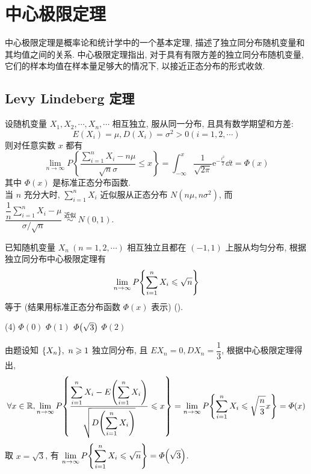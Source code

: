\section{中心极限定理}

中心极限定理是概率论和统计学中的一个基本定理, 描述了独立同分布随机变量和其均值之间的关系. 中心极限定理指出, 对于具有有限方差的独立同分布随机变量, 它们的样本均值在样本量足够大的情况下, 以接近正态分布的形式收敛. 

\subsection{Levy Lindeberg 定理}

\begin{theorem}
    设随机变量 $ X_{1}, X_{2}, \cdots, X_{n}, \cdots $ 相互独立, 服从同一分布, 且具有数学期望和方差:
    $$E\left(X_{i}\right)=\mu, D\left(X_{i}\right)=\sigma^{2}>0(i=1,2, \cdots)$$
    则对任意实数 $ x $ 都有
    $$\lim _{n \rightarrow \infty} P\left\{\frac{\sum_{i=1}^{n} X_{i}-n \mu}{\sqrt{n} \sigma} \leqslant x\right\}=\int_{-\infty}^{x} \frac{1}{\sqrt{2 \pi}} \mathrm{e}^{-\frac{t^{2}}{2}}\dd t=\varPhi(x)$$
    其中 $ \varPhi(x) $ 是标准正态分布函数.\\
    当 $ n $ 充分大时, 
    $\displaystyle \sum_{i=1}^{n} X_{i} \text { 近似服从正态分布 } N\left(n \mu, n \sigma^{2}\right) $, 
    而 $\dfrac{\displaystyle \dfrac{1}{n}\sum_{i=1}^{n} X_{i}-\mu}{\sigma / \sqrt{n}} \stackrel{\text { 近似 }}{\sim} N(0,1) .$
\end{theorem}

\begin{example}
    已知随机变量 $X_n~(n=1,2, \cdots )$ 相互独立且都在 $(-1,1)$ 上服从均匀分布, 根据独立同分布中心极限定理有 $$
    \lim_{n \to \infty}P\qty{\sum_{i=1}^{n} X_i\leqslant \sqrt{n}}
    $$
    等于 (结果用标准正态分布函数 $\varPhi(x)$ 表示) (\quad).
    \begin{tasks}(4)
        \task $\varPhi(0)$
        \task $\varPhi(1)$
        \task $\varPhi\qty(\sqrt{3})$
        \task $\varPhi(2)$
    \end{tasks}
\end{example}
\begin{solution}
    由题设知 $\qty{X_n},~n\geqslant 1$ 独立同分布, 且 $EX_n=0,DX_n=\dfrac{1}{3}$, 
    根据中心极限定理得出, 
    $$
    \forall x\in \mathbb{R},\lim_{n \to \infty}P\qty{\dfrac{\displaystyle \sum_{i=1}^{n} X_i-E\qty(\sum_{i=1}^{n} X_i)}{\sqrt{D\qty(\displaystyle \sum_{i=1}^{n} X_i)}}\leqslant x}=\lim_{n \to \infty}P\qty{\sum_{i=1}^{n} X_i\leqslant \sqrt{\dfrac{n}{3}}x}=\varPhi(x)
    $$
    取 $x=\sqrt{3}$, 有 $ \displaystyle \lim_{n \to \infty}P\qty{\sum_{i=1}^{n} X_i\leqslant \sqrt{n}} =\varPhi\qty(\sqrt{3})$.
\end{solution}

